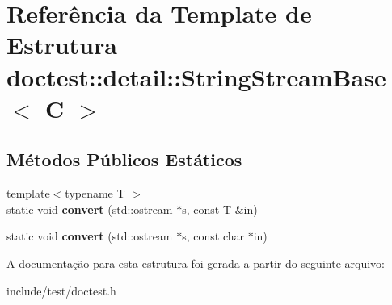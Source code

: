 \hypertarget{structdoctest_1_1detail_1_1StringStreamBase}{}\section{Referência da Template de Estrutura doctest\+:\+:detail\+:\+:String\+Stream\+Base$<$ C $>$}
\label{structdoctest_1_1detail_1_1StringStreamBase}
\subsection*{Métodos Públicos Estáticos}
\begin{DoxyCompactItemize}
\item 
\mbox{\label{structdoctest_1_1detail_1_1StringStreamBase_a0eca8e2711f17a565fea3696635a3833}} 
{\footnotesize template$<$typename T $>$ }\\static void {\bfseries convert} (std\+::ostream $\ast$s, const T \&in)
\item 
\mbox{\label{structdoctest_1_1detail_1_1StringStreamBase_a7c248639907b26e46344b91d7ab90be7}} 
static void {\bfseries convert} (std\+::ostream $\ast$s, const char $\ast$in)
\end{DoxyCompactItemize}


A documentação para esta estrutura foi gerada a partir do seguinte arquivo\+:\begin{DoxyCompactItemize}
\item 
include/test/doctest.\+h\end{DoxyCompactItemize}
